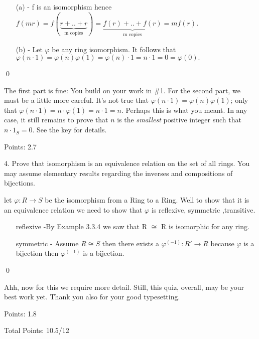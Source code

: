 \documentclass[11pt]{article}
\newcommand{\vp}{\varphi}
\begin{document}


\proof
{
\begin{itemize}
    \item[(a)]- f is an isomorphism hence \(f(mr)= f(\underbrace{r+..+r}_\text{m copies}) = \underbrace{f(r)+..+f(r)}_\text{m copies} = mf(r).\)
    \item[(b)]- Let \(\vp\) be any ring isomorphism. It follows that \(\vp(n\cdot1) = \vp(n)\vp(1) = \vp(n)\cdot1 = n \cdot 1 = 0 = \vp(0).\)
\end{itemize}
}
\qed

\begin{solution}
The first part is fine:  You build on your work in \#1.  For the second part, we must be a little more careful.  It's not true that \(\vp(n\cdot1) = \vp(n)\vp(1)\); only that \(\vp(n\cdot 1)=n\cdot \vp(1)=n\cdot 1=n\).  Perhaps this is what you meant.  In any case, it still remains to prove that \(n\) is the \emph{smallest} positive integer such that \(n\cdot 1_S=0\).  See the key for details.

Points:  2.7
\end{solution}

\exercise
{
4. Prove that isomorphism is an equivalence relation on the set of all rings.  You may assume elementary results regarding the inverses and compositions of bijections.
}

\proof
{ let \(\vp:R\rightarrow S \) be the isomorphism from a Ring to a Ring.
Well to show that it is an equivalence relation we need to show that \(\vp\) is reflexive, symmetric ,transitive.

\begin{itemize}
    \item[reflexive]-By Example 3.3.4 we saw that R \(\cong\) R is isomorphic for any ring.
    \item[symmetric]- Assume \(R\cong S \) then there exists a \(\vp^(-1):R\prime \rightarrow R\) because \(\vp\) is a bijection then \(\vp^(-1)\) is a bijection.  \
\end{itemize}

}
\qed

\begin{solution}
Ahh, now for this we require more detail.  Still, this quiz, overall, may be your best work yet.  Thank you also for your good typesetting.

Points:  1.8

Total Points:  10.5/12
\end{solution}
\end{document}
